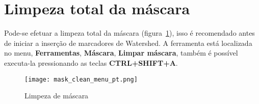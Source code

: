 \section{Limpeza total da máscara}
\label{cap:limpeza_mascara}

Pode-se efetuar a limpeza total da máscara (figura~\ref{fig:limpeza_mascara}), isso é recomendado antes de iniciar a inserção de marcadores de Watershed. A ferramenta está localizada no menu, \textbf{Ferramentas}, \textbf{Máscara}, \textbf{Limpar máscara}, também é possível executa-la pressionando as teclas \textbf{CTRL+SHIFT+A}.

\begin{figure}[!htb]
\centering
\texttt{[image: mask\_clean\_menu\_pt.png]}
\caption{Limpeza de máscara}
\label{fig:limpeza_mascara}
\end{figure}